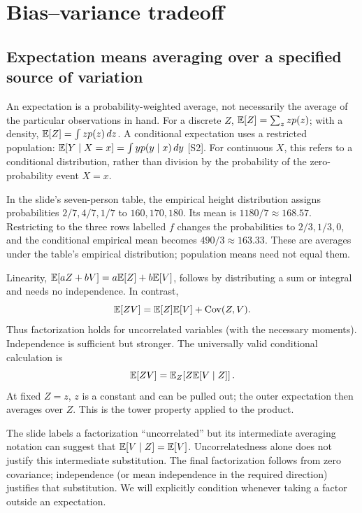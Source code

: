 \section{Bias--variance tradeoff}
\subsection{Expectation means averaging over a specified source of variation}
\label{sec:reg:expect}
An expectation is a probability-weighted average, not necessarily the average of the particular observations in hand. For a discrete $Z$, $\mathbb{E}[Z]=\sum_z zp(z)$; with a density, $\mathbb{E}[Z]=\int z p(z)\,dz$. A conditional expectation uses a restricted population: $\mathbb{E}[Y\mid X=x]=\int y p(y\mid x)\,dy$ [S2]. For continuous $X$, this refers to a conditional distribution, rather than division by the probability of the zero-probability event $X=x$.

In the slide's seven-person table, the empirical height distribution assigns probabilities $2/7,4/7,1/7$ to $160,170,180$. Its mean is $1180/7\approx168.57$. Restricting to the three rows labelled $f$ changes the probabilities to $2/3,1/3,0$, and the conditional empirical mean becomes $490/3\approx163.33$. These are averages under the table's empirical distribution; population means need not equal them.

Linearity, $\mathbb{E}[aZ+bV]=a\mathbb{E}[Z]+b\mathbb{E}[V]$, follows by distributing a sum or integral and needs no independence. In contrast,
\[
\mathbb{E}[ZV]=\mathbb{E}[Z]\mathbb{E}[V]+\operatorname{Cov}(Z,V).
\]
Thus factorization holds for uncorrelated variables (with the necessary moments). Independence is sufficient but stronger. The universally valid conditional calculation is
\begin{equation}
\mathbb{E}[ZV]=\mathbb{E}_Z\!\left[Z\mathbb{E}[V\mid Z]\right].
\label{eq:reg:tower}
\end{equation}
At fixed $Z=z$, $z$ is a constant and can be pulled out; the outer expectation then averages over $Z$. This is the tower property applied to the product.

\begin{warning}
The slide labels a factorization ``uncorrelated'' but its intermediate averaging notation can suggest that $\mathbb{E}[V\mid Z]=\mathbb{E}[V]$. Uncorrelatedness alone does not justify this intermediate substitution. The final factorization follows from zero covariance; independence (or mean independence in the required direction) justifies that substitution. We will explicitly condition whenever taking a factor outside an expectation.
\end{warning}
